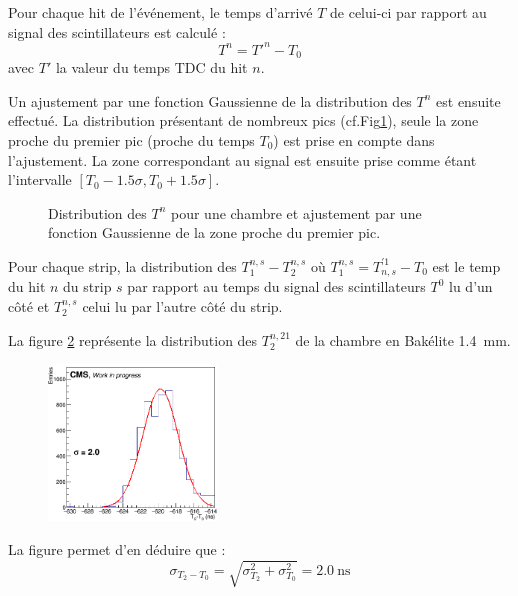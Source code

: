 Pour chaque hit de l'événement, le temps d'arrivé $T$ de celui-ci par rapport au signal des scintillateurs est calculé :
\begin{equation}
	T^n=T'^n-T_0
\end{equation}
avec $T'$ la valeur du temps TDC du hit $n$. 

Un ajustement par une fonction Gaussienne de la distribution des $T^n$ est ensuite effectué. La distribution présentant de nombreux pics (cf.Fig\ref{pics}), seule la zone proche du premier pic (proche du temps $T_0$) est prise en compte dans l'ajustement. La zone correspondant au signal est ensuite prise comme étant l'intervalle $\left[T_0-\num{1.5}\sigma,T_0+\num{1.5}\sigma\right]$.

\begin{figure}[!ht]
	\centering
	\caption{Distribution des $T^n$ pour une chambre et ajustement par une fonction Gaussienne de la zone proche du premier pic.}
	\label{pics}
\end{figure}

Pour chaque strip, la distribution des $T^{n,s}_1-T^{n,s}_2$ où $T^{n,s}_1=T_{n,s}^{'1}-T_0$ est le temp du hit $n$ du strip $s$ par rapport au temps du signal des scintillateurs $T^{0}$ lu d'un côté et $T^{n,s}_2$ celui lu par l'autre côté du strip.

La figure \ref{t2t0} représente la distribution des $T^{n,21}_2$ de la chambre en Bakélite \SI{1.4}{\milli\meter}.
\begin{figure}[ht!]
	\centering
	\includegraphics[width=0.40\textwidth]{ELE/TimingFitsRunT1T0_zoom_736185.jpg}
	\label{t2t0}
\end{figure}

La figure permet d'en déduire que :
\begin{equation}
\sigma_{T_2-T_0}=\sqrt{\sigma_{T_2}^2+\sigma_{T_0}^2}=\SI{2.0}{\nano\second}
\end{equation}

